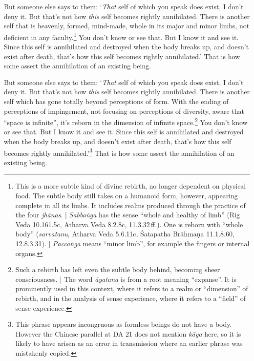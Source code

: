 \documentclass[12pt,openany]{book}%
\begin{document}
But someone else says to them: ‘\emph{That} self of which you speak does exist, I don’t deny it. But that’s not how \emph{this} self becomes rightly annihilated. There is another self that is heavenly, formed, mind-made, whole in its major and minor limbs, not deficient in any faculty.\footnote{This is a more subtle kind of divine rebirth, no longer dependent on physical food. The subtle body still takes on a humanoid form, however, appearing complete in all its limbs. It includes realms produced through the practice of the four \textit{\textsanskrit{jhānas}}. | \textit{\textsanskrit{Sabbaṅga}} has the sense “whole and healthy of limb” (Rig Veda 10.161.5c, Atharva Veda 8.2.8c, 11.3.32 ff.). One is reborn with “whole body” (\textit{sarvatanu}, Atharva Veda 5.6.11c, Śatapatha \textsanskrit{Brāhmaṇa} 11.1.8.60, 12.8.3.31). | \textit{\textsanskrit{Paccaṅga}} means “minor limb”, for example the fingers or internal organs. } You don’t know or see that. But I know it and see it. Since this self is annihilated and destroyed when the body breaks up, and doesn’t exist after death, that’s how this self becomes rightly annihilated.’ That is how some assert the annihilation of an existing being. 

But someone else says to them: ‘\emph{That} self of which you speak does exist, I don’t deny it. But that’s not how \emph{this} self becomes rightly annihilated. There is another self which has gone totally beyond perceptions of form. With the ending of perceptions of impingement, not focusing on perceptions of diversity, aware that “space is infinite”, it’s reborn in the dimension of infinite space.\footnote{Such a rebirth has left even the subtle body behind, becoming sheer consciousness. | The word \textit{\textsanskrit{āyatana}} is from a root meaning “expanse”. It is prominently used in this context, where it refers to a realm or “dimension” of rebirth, and in the analysis of sense experience, where it refers to a “field” of sense experience. } You don’t know or see that. But I know it and see it. Since this self is annihilated and destroyed when the body breaks up, and doesn’t exist after death, that’s how this self becomes rightly annihilated.’\footnote{This phrase appears incongruous as formless beings do not have a body. However the Chinese parallel at DA 21 does not mention \textit{\textsanskrit{kāya}} here, so it is likely to have arisen as an error in transmission where an earlier phrase was mistakenly copied. } That is how some assert the annihilation of an existing being. 
\end{document}
